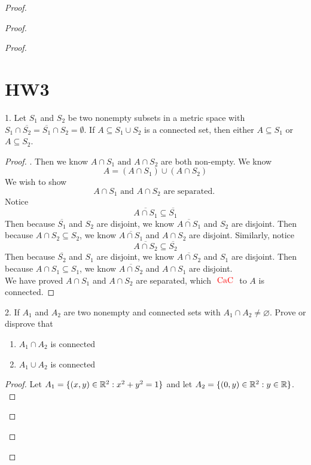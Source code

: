 \documentclass{report}
\begin{document}
\begin{proof}
\begin{proof}
\begin{proof}
\section{HW3}
\begin{question}{}{}
1. Let $S_1$ and $S_2$ be two nonempty subsets in a metric space with $S_1 \cap \overline{S_2} = \overline{S_1}\cap S_2 = \emptyset$. If $A \subseteq S_1 \cup S_2$ is a connected set, then either $A \subseteq S_1$ or $A \subseteq S_2$.
\end{question}
\begin{proof}
. Then we know $A\cap S_1\text{ and }A\cap S_2$ are both non-empty. We know
\begin{equation}
A=(A\cap S_1)\cup (A\cap S_2)
\end{equation}
We wish to show
 \begin{equation}
A\cap S_1\text{ and }A\cap S_2\text{ are separated. }
\end{equation}
Notice 
\begin{equation}
\overline{A\cap S_1}\subseteq \overline{S_1}
\end{equation}
Then because $\overline{S_1}$ and $S_2$ are disjoint, we know $\overline{A\cap S_1}$ and $S_2$ are disjoint. Then because $A\cap S_2\subseteq S_2$, we know $\overline{A\cap S_1}$ and $A\cap S_2$ are disjoint. Similarly, notice
\begin{equation}
\overline{A\cap S_2}\subseteq \overline{S_2}
\end{equation}
Then because $\overline{S_2}$ and $S_1$ are disjoint, we know $\overline{A\cap S_2}$ and $S_1$ are disjoint. Then because $A\cap S_1\subseteq S_1$, we know $\overline{A\cap S_2}$ and $A\cap S_1$ are disjoint.    \\

We have proved $A\cap S_1$ and $A\cap S_2$ are separated, which $\text{ \textcolor{red}{CaC} }$ to $A$ is connected.
\end{proof}
\begin{question}{}{}
2. If $A_1$ and $A_2$ are two nonempty and connected sets with $A_1\cap A_2\neq \varnothing$. Prove or disprove that
\begin{enumerate}[label=(\alph*)]
  \item $A_1\cap A_2$ is connected
  \item $A_1\cup A_2$ is connected
\end{enumerate}
\end{question}
\begin{proof}
Let $A_1=\{ (x,y)\in\mathbb{R}^2:x^2+y^2=1 \}$ and let  $A_2=\{ (0,y)\in\mathbb{R}^2:y\in\mathbb{R} \}$.\\


\end{proof}
\end{proof}
\end{proof}
\end{proof}
\end{document}
